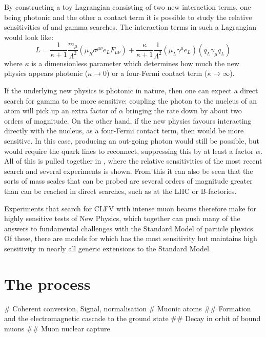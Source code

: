 By constructing a toy Lagrangian consisting of two new interaction terms, one being photonic and the other a contact term it is possible to study the relative sensitivities of \mueconv and \mutoe gamma searches.
The interaction terms in such a Lagrangian would look like:
\begin{equation}
L=\frac{1}{\kappa+1}\frac{m_\mu}{\Lambda^2}\left(\bar{\mu}_R\sigma^{\mu\nu}e_LF_{\mu\nu}\right)+\frac{\kappa}{\kappa+1}\frac{1}{\Lambda^2}\left(\bar{\mu_L}\gamma^\mu e_L\right)\left(\bar{q_L}\gamma_\mu q_L\right)
\end{equation}
where $\kappa$ is a dimensionless parameter which determines how much the new physics appears photonic ($\kappa\rightarrow0$) or a four-Fermi contact term ($\kappa\rightarrow\infty$).

If the underlying new physics is photonic in nature, then one can expect a direct search for \mutoe gamma to be more sensitive: coupling the photon to the nucleus of an atom will pick up an extra factor of $\alpha$ bringing the rate down by about two orders of magnitude.
On the other hand, if the new physics favours interacting directly with the nucleus, as a four-Fermi contact term, then \mueconv would be more sensitive. 
In this case, producing an out-going photon would still be possible, but would require the quark lines to reconnect, suppressing this by at least a factor $\alpha$.
All of this is pulled together in , where the relative sensitivities of the most recent \muegamma search and several \mueconv experiments is shown.
From this it can also be seen that the sorts of mass scales that can be probed are several orders of magnitude greater than can be reached in direct searches, such as at the LHC or B-factories.

Experiments that search for \ac{CLFV} with intense muon beams therefore make for highly sensitive tests of New Physics, which together can push many of the answers to fundamental challenges with the Standard Model of particle physics.
Of these, there are models for which \mueconv has the most sensitivity but maintains high sensitivity in nearly all generic extensions to the Standard Model.

\section{The \mueconv process}
\begin{easylist}
  # Coherent conversion, Signal, normalisation
  # Muonic atoms
  ## Formation and the electromagnetic cascade to the ground state
  ## Decay in orbit of bound muons
  ## Muon nuclear capture
\end{easylist}
